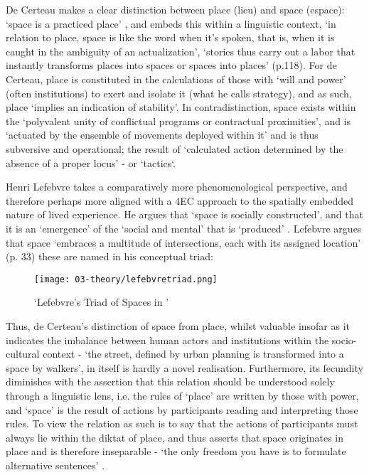 De Certeau makes a clear distinction between place (lieu) and space (espace): `space is a practiced place' \citeyearpar[p. 117]{decerteau1984}, and embeds this within a linguistic context, `in relation to place, space is like the word when it's spoken, that is, when it is caught in the ambiguity of an actualization', `stories thus carry out a labor that instantly transforms places into spaces or spaces into places' (p.118). For de Certeau, place is constituted in the calculations of those with `will and power' (often institutions) to exert and isolate it (what he calls strategy), and as such, place `implies an indication of stability'. In contradistinction, space exists within the `polyvalent unity of conflictual programs or contractual proximities', and is `actuated by the ensemble of movements deployed within it' and is thus subversive and operational; the result of `calculated action determined by the absence of a proper locus' - or `tactics`. 

Henri Lefebvre takes a comparatively more phenomenological perspective, and therefore perhaps more aligned with a 4EC approach to the spatially embedded nature of lived experience. He argues that `space is socially constructed', and that it is an `emergence' of the `social and mental' that is `produced' \citeyearpar[p. 260]{lefebvre1991}. Lefebvre argues that space `embraces a multitude of intersections, each with its assigned location' (p. 33) these are named in his conceptual triad:

\begin{figure}[bth]
    \myfloatalign
    {\texttt{[image: 03-theory/lefebvretriad.png]}}
    \caption[`Lefebvre's Triad of Spaces in (Günzel, 2019, p.14)']{`Lefebvre's Triad of Spaces in \citep[p. 14]{gunzel2019}'}\label{fig: lefebvretriad}
\end{figure}

Thus, de Certeau's distinction of space from place, whilst valuable insofar as it indicates the imbalance between human actors and institutions within the socio-cultural context - `the street, defined by urban planning is transformed into a space by walkers', in itself is hardly a novel realisation. Furthermore, its fecundity diminishes with the assertion that this relation should be understood solely through a linguistic lens, i.e. the rules of `place' are written by those with power, and `space' is the result of actions by participants reading and interpreting those rules. To view the relation as such is to say that the actions of participants must always lie within the diktat of place, and thus asserts that space originates in place and is therefore inseparable - `the only freedom you have is to formulate alternative sentences' \citep{vermeulen2015}. 

